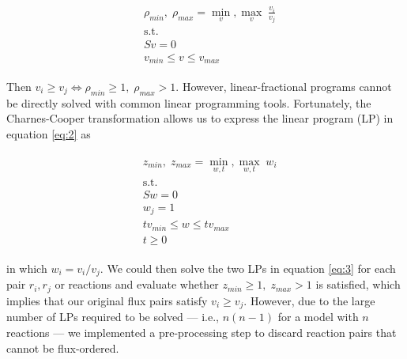 \documentclass[12pt]{article}
\begin{document}
\begin{align}
\begin{aligned}
&\rho_{min},\; \rho_{max} = \min_v, \max_v \; \frac{v_i}{v_j}
\\
&\mathrm{s.t.}
\\
&Sv=0
\\
&v_{min} \leq v \leq v_{max}
\end{aligned}
\label{eq:2}
\end{align}

Then $v_i \geq v_j \iff \rho_{min} \geq 1,\; \rho_{max} > 1$. However, linear-fractional programs cannot be directly solved with common linear programming tools. Fortunately, the Charnes-Cooper transformation \cite{Charnes1962a} allows us to express the linear program (LP) in equation \ref{eq:2} as

\begin{align}
\begin{aligned}
&z_{min},\; z_{max} = \min_{w,t}, \max_{w,t} \; w_i
\\
&\mathrm{s.t.}
\\
&Sw = 0
\\
&w_j = 1
\\
&tv_{min} \leq w \leq tv_{max}
\\
&t \geq 0
\end{aligned}
\label{eq:3}
\end{align}

\noindent in which $w_i = v_i / v_j$. We could then solve the two LPs in equation \ref{eq:3} for each pair $r_i, r_j$ or reactions and evaluate whether $z_{min} \geq 1,\; z_{max} > 1$ is satisfied, which implies that our original flux pairs satisfy $v_i \geq v_j$. However, due to the large number of LPs required to be solved --- i.e., $n(n-1)$ for a model with $n$ reactions --- we implemented a pre-processing step to discard reaction pairs that cannot be flux-ordered.
\end{document}
